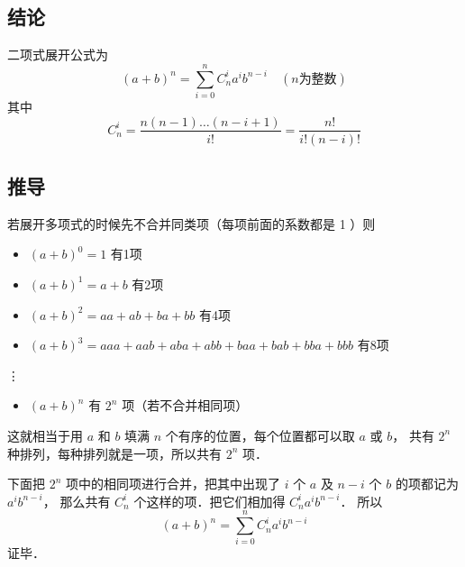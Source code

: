 
\subsection{结论}
二项式展开公式为
\begin{equation}
(a + b)^n = \sum_{i = 0}^n  C_n^i a^i b^{n - i} \quad (n \text{为整数})
\end{equation}
其中
\begin{equation}
C_n^i = \frac{n(n - 1)\dots (n - i + 1)}{i!} = \frac{n!}{i!(n - i)!}
\end{equation}

\subsection{推导}
若展开多项式的时候先不合并同类项（每项前面的系数都是 1 ）则
\begin{itemize}
\item $(a + b)^0 = 1$ 有1项
\item $(a + b)^1 = a + b$ 有2项
\item $(a + b)^2 = aa + ab + ba + bb$ 有4项
\item $(a + b)^3 = aaa + aab + aba + abb + baa + bab + bba + bbb$ 有8项
\end{itemize}
\qquad \vdots
\begin{itemize}
\item $(a + b)^n$ 有 $2^n$ 项（若不合并相同项）
\end{itemize}

这就相当于用 $a$ 和 $b$ 填满 $n$ 个有序的位置，每个位置都可以取 $a$ 或 $b$， 共有 $2^n$ 种排列，每种排列就是一项，所以共有 $2^n$ 项．

下面把 $2^n$ 项中的相同项进行合并，把其中出现了 $i$ 个 $a$ 及 $n-i$ 个 $b$ 的项都记为 $a^i b^{n-i}$， 那么共有 $C_n^i$ 个这样的项．把它们相加得 $C_n^i a^i b^{n-i}$． 所以
\begin{equation}
(a + b)^n = \sum_{i = 0}^n  C_n^i a^i b^{n - i}
\end{equation}
证毕．

